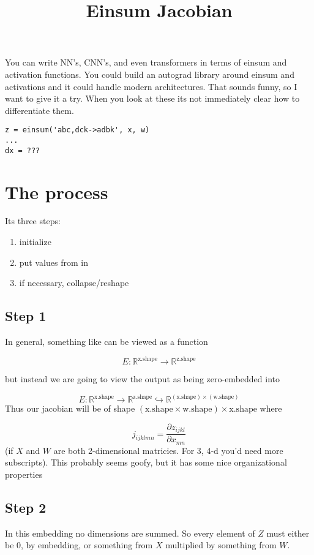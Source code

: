 \documentclass[11pt]{article}
\title{Einsum Jacobian}
\begin{document}
\maketitle


You can write NN's, CNN's, and even transformers in terms of einsum and activation functions.
You could build an autograd library around einsum and activations and it could handle modern architectures. That sounds funny, so I want to give it a try. 
When you look at these its not immediately clear how to differentiate them.
\begin{verbatim}
z = einsum('abc,dck->adbk', x, w)
...
dx = ???
\end{verbatim}

\section*{The process}

Its three steps:
\begin{enumerate}
    \item initialize 
    \item put values from  in 
    \item  if necessary, collapse/reshape  
\end{enumerate}

\subsection*{Step 1}
In general, something like  can be viewed as a function 

\[E : \mathbb{R}^{\text{x.shape}}\rightarrow \mathbb{R}^{\text{z.shape}}\]

but instead we are going to view the output as being zero-embedded into 

\[E : \mathbb{R}^{\text{x.shape}}\rightarrow \mathbb{R}^{\text{z.shape}} \hookrightarrow \mathbb{R}^{(\text{x.shape})\times(\text{w.shape})}\] 
Thus our jacobian will be of shape $(\text{x.shape} \times \text{w.shape}) \times \text{x.shape}$ where

\[
j_{ijklmn} = \frac{\partial z_{ijkl}}{\partial x_{mn}}
\]
(if $X$ and $W$ are both 2-dimensional matricies. For 3, 4-d you'd need more subscripts). 
This probably seems goofy, but it has some nice organizational properties 
\subsection*{Step 2}
In this embedding no dimensions are summed. So every element of $Z$ must either be $0$,
by embedding, or something from $X$ multiplied by something from $W$. 
\end{document}

